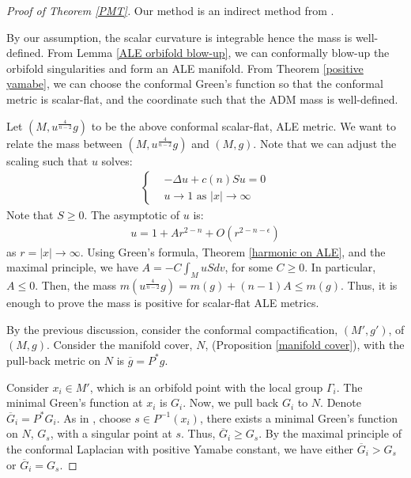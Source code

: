 \documentclass[12pt]{amsart}
\theoremstyle{definition}
\begin{document}
\begin{proof}[Proof of Theorem \ref{PMT}]
        Our method is an indirect method from \cite{SYconformal}.

        By our assumption, the scalar curvature is integrable hence the mass is well-defined. From Lemma \ref{ALE orbifold blow-up}, we can conformally blow-up the orbifold singularities and form an ALE manifold. From Theorem \ref{positive yamabe}, we can choose the conformal Green's function so that the conformal metric is scalar-flat, and the coordinate such that the ADM mass is well-defined. 

        Let $(M,u^{\frac{4}{n-2}}g)$ to be the above conformal scalar-flat, ALE metric. We want to relate the mass between $(M,u^{\frac{4}{n-2}}g)$ and $(M,g)$. Note that we can adjust the scaling such that $u$ solves:
        \begin{align*}
            \left\{
            \begin{aligned}
                &-\Delta u + c(n) S u = 0\\
                &u\to 1\text{ as }|x|\to\infty
            \end{aligned}
            \right.
        \end{align*}
        Note that $S\geq 0$. The asymptotic of $u$ is:
        \begin{align*}
            u = 1 + Ar^{2-n} + O(r^{2-n-\epsilon})
        \end{align*}
        as $r = |x|\to\infty$. Using Green's formula, Theorem \ref{harmonic on ALE}, and the maximal principle, we have $A=-C\int_MuSdv$, for some $C\geq0$. In particular, $A\leq0$. Then, the mass $m(u^{\frac{4}{n-2}}g) = m(g) + (n-1)A\leq m(g)$. Thus, it is enough to prove the mass is positive for scalar-flat ALE metrics.
        
        By the previous discussion, consider the conformal compactification, $(M',g')$, of $(M,g)$. Consider the manifold cover, $N$, (Proposition \ref{manifold cover}), with the pull-back metric on $N$ is $\overline{g} = P^*g$.
    
    Consider $x_i\in M'$, which is an orbifold point with the local group $\Gamma_i$. The minimal Green's function at $x_i$ is $G_i$. Now, we pull back $G_i$ to $N$. Denote $\overline{G}_i=P^* G_i$. As in \cite{SYconformal}, choose $s\in P^{-1}(x_i)$, there exists a minimal Green's function on $N$, $G_s$, with a singular point at $s$. Thus, $\overline{G}_i\geq G_s$. By the maximal principle of the conformal Laplacian with positive Yamabe constant, we have either $\overline{G}_i>G_s$ or $\overline{G}_i=G_s$.
    

\end{proof}
\end{document}
